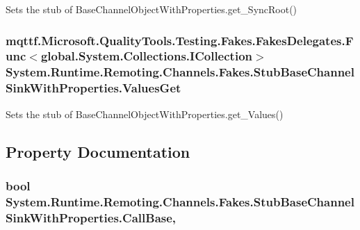 Sets the stub of Base\-Channel\-Object\-With\-Properties.\-get\-\_\-\-Sync\-Root()

\hypertarget{class_system_1_1_runtime_1_1_remoting_1_1_channels_1_1_fakes_1_1_stub_base_channel_sink_with_properties_adb95e37411477cb9e3a12e3000bd27ac}{
\subsubsection[{Values\-Get}]{\setlength{\rightskip}{0pt plus 5cm}mqttf.\-Microsoft.\-Quality\-Tools.\-Testing.\-Fakes.\-Fakes\-Delegates.\-Func$<$global.\-System.\-Collections.\-I\-Collection$>$ System.\-Runtime.\-Remoting.\-Channels.\-Fakes.\-Stub\-Base\-Channel\-Sink\-With\-Properties.\-Values\-Get}}\label{class_system_1_1_runtime_1_1_remoting_1_1_channels_1_1_fakes_1_1_stub_base_channel_sink_with_properties_adb95e37411477cb9e3a12e3000bd27ac}


Sets the stub of Base\-Channel\-Object\-With\-Properties.\-get\-\_\-\-Values()



\subsection{Property Documentation}
\hypertarget{class_system_1_1_runtime_1_1_remoting_1_1_channels_1_1_fakes_1_1_stub_base_channel_sink_with_properties_a53fac9c70dcafe09e3a98cf4e36135c1}{
\subsubsection[{Call\-Base}]{\setlength{\rightskip}{0pt plus 5cm}bool System.\-Runtime.\-Remoting.\-Channels.\-Fakes.\-Stub\-Base\-Channel\-Sink\-With\-Properties.\-Call\-Base\hspace{0.3cm}{\ttfamily [get]}, {\ttfamily [set]}}}\label{class_system_1_1_runtime_1_1_remoting_1_1_channels_1_1_fakes_1_1_stub_base_channel_sink_with_properties_a53fac9c70dcafe09e3a98cf4e36135c1}


